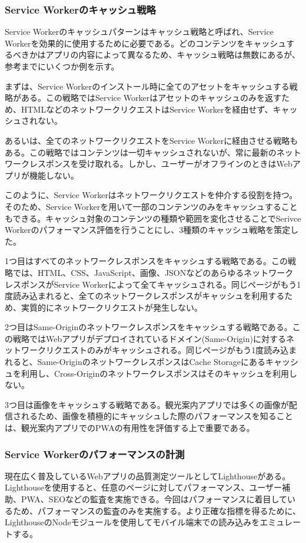 \subsubsection{Service Workerのキャッシュ戦略}
\label{Service Workerのキャッシュパターン}
Service Workerのキャッシュパターンはキャッシュ戦略と呼ばれ、Service Workerを効果的に使用するために必要である。どのコンテンツをキャッシュするべきかはアプリの内容によって異なるため、キャッシュ戦略は無数にあるが、参考までにいくつか例を示す。

まずは、Service Workerのインストール時に全てのアセットをキャッシュする戦略がある。この戦略ではService Workerはアセットのキャッシュのみを返すため、HTMLなどのネットワークリクエストはService Workerを経由せず、キャッシュされない。

あるいは、全てのネットワークリクエストをService Workerに経由させる戦略もある。この戦略ではコンテンツは一切キャッシュされないが、常に最新のネットワークレスポンスを受け取れる。しかし、ユーザーがオフラインのときはWebアプリが機能しない。

このように、Service Workerはネットワークリクエストを仲介する役割を持つ。そのため、Service Workerを用いて一部のコンテンツのみをキャッシュすることもできる。キャッシュ対象のコンテンツの種類や範囲を変化させることでSerivce Workerのパフォーマンス評価を行うことにし、3種類のキャッシュ戦略を策定した。

1つ目はすべてのネットワークレスポンスをキャッシュする戦略である。この戦略では、HTML、CSS、JavaScript、画像、JSONなどのあらゆるネットワークレスポンスがService Workerによって全てキャッシュされる。同じページがもう1度読み込まれると、全てのネットワークレスポンスがキャッシュを利用するため、実質的にネットワークリクエストが発生しない。

2つ目はSame-Originのネットワークレスポンスをキャッシュする戦略である。この戦略ではWebアプリがデプロイされているドメイン(Same-Origin)に対するネットワークリクエストのみがキャッシュされる。同じページがもう1度読み込まれると、Same-OriginのネットワークレスポンスはCache Storageにあるキャッシュを利用し、Cross-Originのネットワークレスポンスはそのキャッシュを利用しない。

3つ目は画像をキャッシュする戦略である。観光案内アプリでは多くの画像が配信されるため、画像を積極的にキャッシュした際のパフォーマンスを知ることは、観光案内アプリでのPWAの有用性を評価する上で重要である。
\subsubsection{Service Workerのパフォーマンスの計測}
\label{subsubsection:Service Workerのパフォーマンスの計測}
現在広く普及しているWebアプリの品質測定ツールとしてLighthouseがある。Lighthouseを使用すると、任意のページに対してパフォーマンス、ユーザー補助、PWA、SEOなどの監査を実施できる。今回はパフォーマンスに着目しているため、パフォーマンスの監査のみを実施する。より正確な指標を得るために、LighthouseのNodeモジュールを使用してモバイル端末での読み込みをエミュレートする。

